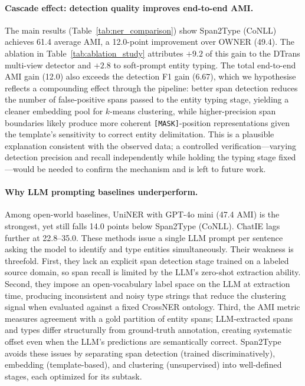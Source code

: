 \documentclass[14pt]{extreport}
\begin{document}
\paragraph{Cascade effect: detection quality improves end-to-end AMI.}
The main results (Table~\ref{tab:ner_comparison}) show Span2Type (CoNLL) achieves 61.4 average AMI, a 12.0-point improvement over OWNER (49.4).
The ablation in Table~\ref{tab:ablation_study} attributes $+9.2$ of this gain to the DTrans multi-view detector and $+2.8$ to soft-prompt entity typing.
The total end-to-end AMI gain (12.0) also exceeds the detection F1 gain (6.67), which we hypothesise reflects a compounding effect through the pipeline: better span detection reduces the number of false-positive spans passed to the entity typing stage, yielding a cleaner embedding pool for $k$-means clustering, while higher-precision span boundaries likely produce more coherent \texttt{[MASK]}-position representations given the template's sensitivity to correct entity delimitation.
This is a plausible explanation consistent with the observed data; a controlled verification---varying detection precision and recall independently while holding the typing stage fixed---would be needed to confirm the mechanism and is left to future work.

\paragraph{Why LLM prompting baselines underperform.}
Among open-world baselines, UniNER with GPT-4o mini (47.4 AMI) is the strongest, yet still falls 14.0 points below Span2Type (CoNLL). ChatIE lags further at 22.8--35.0. These methods issue a single LLM prompt per sentence asking the model to identify and type entities simultaneously. Their weakness is threefold. First, they lack an explicit span detection stage trained on a labeled source domain, so span recall is limited by the LLM's zero-shot extraction ability. Second, they impose an open-vocabulary label space on the LLM at extraction time, producing inconsistent and noisy type strings that reduce the clustering signal when evaluated against a fixed CrossNER ontology. Third, the AMI metric measures agreement with a gold partition of entity spans; LLM-extracted spans and types differ structurally from ground-truth annotation, creating systematic offset even when the LLM's predictions are semantically correct. Span2Type avoids these issues by separating span detection (trained discriminatively), embedding (template-based), and clustering (unsupervised) into well-defined stages, each optimized for its subtask.
\end{document}
